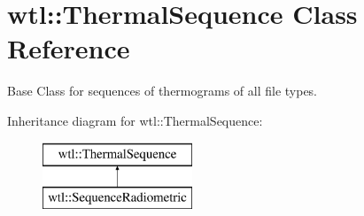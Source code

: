 \hypertarget{classwtl_1_1_thermal_sequence}{}\section{wtl\+:\+:Thermal\+Sequence Class Reference}
\label{classwtl_1_1_thermal_sequence}


Base Class for sequences of thermograms of all file types.  


Inheritance diagram for wtl\+:\+:Thermal\+Sequence\+:\begin{figure}[H]
\begin{center}
\leavevmode
\includegraphics[height=2.000000cm]{classwtl_1_1_thermal_sequence}
\end{center}
\end{figure}
